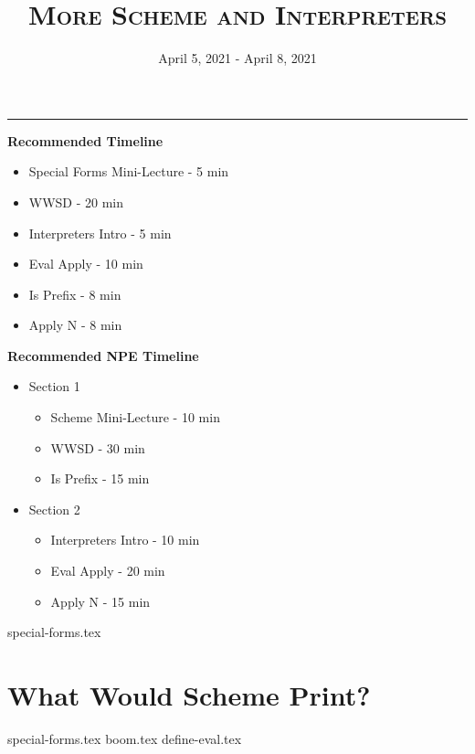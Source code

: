 \documentclass{exam}
\title{\textsc{More Scheme and Interpreters}}
\date{April 5, 2021 - April 8, 2021}
\begin{document}
\maketitle
\rule{\textwidth}{0.15em}
\fontsize{12}{15}\selectfont


\begin{guide}
\textbf{Recommended Timeline}
\begin{itemize}
  \item Special Forms Mini-Lecture - 5 min
  \item WWSD - 20 min
  \item Interpreters Intro - 5 min
  \item Eval Apply - 10 min
  \item Is Prefix - 8 min
  \item Apply N - 8 min
\end{itemize}

\textbf{Recommended NPE Timeline}
  \begin{itemize}
  \item Section 1
  \begin{itemize}
    \item Scheme Mini-Lecture - 10 min
    \item WWSD - 30 min
    \item Is Prefix - 15 min
  \end{itemize}
  \item Section 2
  \begin{itemize}
    \item Interpreters Intro - 10 min
    \item Eval Apply - 20 min
    \item Apply N - 15 min
  \end{itemize}
\end{itemize}
\newpage
\end{guide}




{special-forms.tex}
\section{What Would Scheme Print?}
\begin{questions}
{special-forms.tex}
{boom.tex}
{define-eval.tex}
\end{questions}
\end{document}
